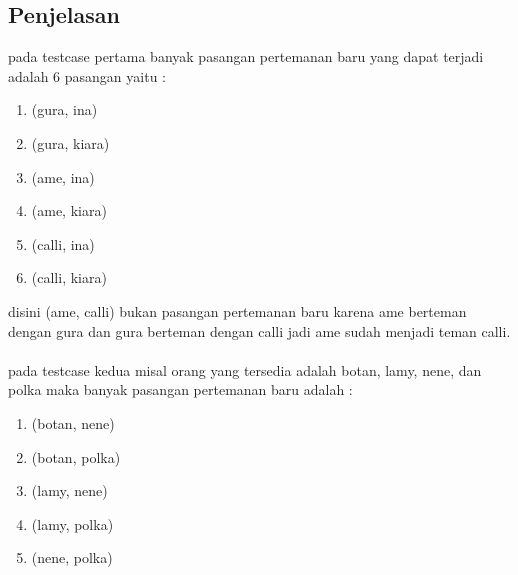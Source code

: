 \documentclass{article}
\begin{document}
\subsection*{Penjelasan}
pada testcase pertama banyak pasangan pertemanan baru yang dapat terjadi adalah 6 pasangan yaitu :
\begin{enumerate}
    \item (gura, ina)
    \item (gura, kiara)
    \item (ame, ina)
    \item (ame, kiara)
    \item (calli, ina)
    \item (calli, kiara)
\end{enumerate}
disini (ame, calli) bukan pasangan pertemanan baru karena ame berteman dengan gura dan gura berteman dengan calli jadi ame sudah menjadi teman calli.\\
\\
pada testcase kedua misal orang yang tersedia adalah botan, lamy, nene, dan polka maka banyak pasangan pertemanan baru adalah :
\begin{enumerate}
    \item (botan, nene)
    \item (botan, polka)
    \item (lamy, nene)
    \item (lamy, polka)
    \item (nene, polka)
\end{enumerate}

\pagebreak
\end{document}
